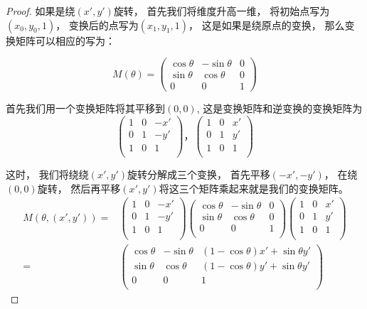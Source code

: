 \begin{defination}[离散动力系统]
\begin{proof}
如果是绕\((x',y')\)旋转，
首先我们将维度升高一维，
将初始点写为\((x_0,y_0,1)\)，
变换后的点写为\((x_1,y_1,1)\)，
这是如果是绕原点的变换，
那么变换矩阵可以相应的写为：

\[M(\theta)=
\left(
  \begin{array}{ccc}
    \cos \theta & -\sin \theta & 0 \\
    \sin \theta & \cos \theta  & 0 \\
    0 & 0 & 1
  \end{array}
\right)\]

首先我们用一个变换矩阵将其平移到\((0,0)\),
这是变换矩阵和逆变换的变换矩阵为
\[\left(
  \begin{array}{ccc}
    1 & 0 & -x' \\
    0 & 1 & -y' \\
    1 & 0 & 1 \\
  \end{array}
\right)，
\left(
  \begin{array}{ccc}
    1 & 0 & x' \\
    0 & 1 & y' \\
    1 & 0 & 1 \\
  \end{array}
\right)\]

这时，
我们将绕绕\((x',y')\)旋转分解成三个变换，
首先平移\((-x',-y')\)，
在绕\((0,0)\)旋转，
然后再平移\((x',y')\)将这三个矩阵乘起来就是我们的变换矩阵。
\begin{align*}
  M(\theta,(x',y'))= & \left(
  \begin{array}{ccc}
    1 & 0 & -x' \\
    0 & 1 & -y' \\
    1 & 0 & 1 \\
  \end{array}
\right)
\left(
  \begin{array}{ccc}
    \cos \theta & -\sin \theta & 0 \\
    \sin \theta & \cos \theta  & 0 \\
    0 & 0 & 1\\
  \end{array}
\right)
\left(
  \begin{array}{ccc}
    1 & 0 & x' \\
    0 & 1 & y' \\
    1 & 0 & 1 \\
  \end{array}
\right)\\
  = & \left(
  \begin{array}{ccc}
    \cos \theta & -\sin \theta & (1-\cos\theta)x'+\sin\theta y' \\
    \sin \theta & \cos \theta  & (1-\cos\theta)y'+\sin\theta y' \\
    0 & 0 & 1\\
  \end{array}
\right)
\end{align*}


\end{proof}
\end{defination}
